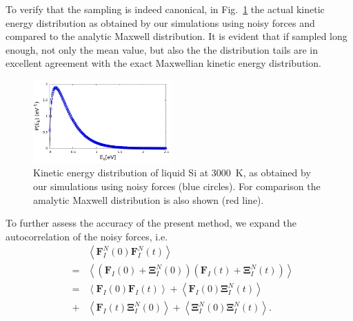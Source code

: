 To verify that the sampling is indeed canonical, in Fig.~\ref{Fig3} the actual kinetic energy distribution as obtained by our simulations using noisy forces and compared to the analytic Maxwell distribution. It is evident that if sampled long enough, not only the mean value, but also the the distribution tails are in excellent agreement with the exact Maxwellian kinetic energy distribution.
\begin{figure}%
\begin{center} 
\includegraphics[width=0.475\textwidth]
{figures/maxwelldistribution.pdf}
\end{center}
\caption{\label{Fig3}
Kinetic energy distribution of liquid Si at 3000~K, as obtained by our simulations using noisy forces (blue circles). For comparison the amalytic Maxwell distribution is also shown (red line).
} \end{figure}
To further assess the accuracy of the present method, we expand the autocorrelation of the noisy forces, i.e. 
\begin{subequations}
\begin{eqnarray}
  && \left \langle \textbf{F}_{I}^{N}\left ( 0 \right )\textbf{F}_{I}^{N}\left ( t \right )\right \rangle \\
  &=& \left \langle \left ( \textbf{F}_{I}\left ( 0 \right ) + \mathbf{\Xi } _{I}^{N} \left(0 \right )\right) \left( \textbf{F}_{I}\left ( t \right )+\mathbf{\Xi } _{I}^{N}\left ( t \right )\right) \right \rangle \\
  &=& \left \langle \textbf{F}_{I}\left ( 0 \right ) \textbf{F}_{I}\left ( t \right )\right \rangle + \left \langle \textbf{F}_{I}\left ( 0 \right ) \mathbf{\Xi } _{I}^{N}\left(t \right )\right \rangle \label{AutoCorr} \\ 
  &+& \left \langle \textbf{F}_{I}\left ( t \right ) \mathbf{\Xi } _{I}^{N}\left(0 \right )\right \rangle + \left \langle \mathbf{\Xi } _{I}^{N}\left(0 \right ) \mathbf{\Xi } _{I}^{N}\left(t \right )\right \rangle.  \nonumber
\end{eqnarray}
\end{subequations}
